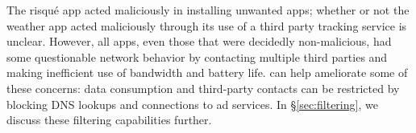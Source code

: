     The risqu\'{e} app acted maliciously in installing unwanted apps; whether or not the weather app acted maliciously through its use of a third party tracking service is unclear.
    However, all apps, even those that were decidedly non-malicious, had some questionable network behavior by contacting multiple third parties and making inefficient use of bandwidth and battery life.
    \meddle can help ameliorate some of these concerns: data consumption and third-party contacts can be restricted by blocking DNS lookups and connections to ad services. 
    In \S\ref{sec:filtering}, we discuss these filtering capabilities further.

